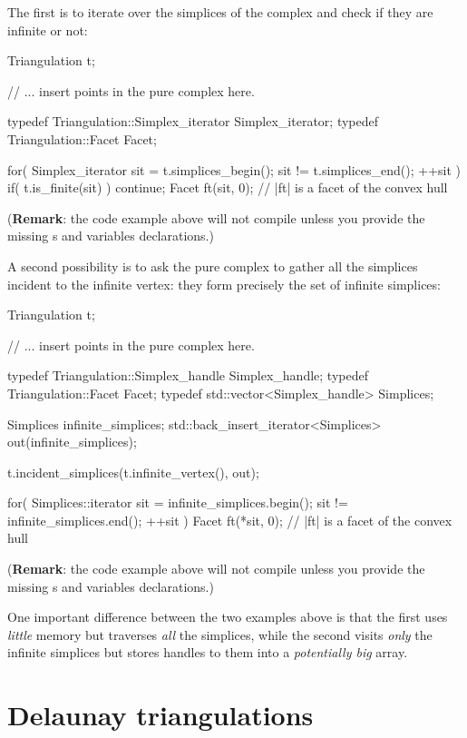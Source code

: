 {{The first is to iterate over the simplices of the complex and check if they
are infinite or not:

\begin{ccExampleCode}
Triangulation t;

// ... insert points in the pure complex here.

typedef Triangulation::Simplex_iterator Simplex_iterator;
typedef Triangulation::Facet Facet;

for( Simplex_iterator sit = t.simplices_begin(); sit != t.simplices_end(); ++sit )
{
    if( t.is_finite(sit) )
        continue;
    Facet ft(sit, 0); // |ft| is a facet of the convex hull
}
\end{ccExampleCode}
(\textbf{Remark}: the code example above will not compile unless you provide
the missing s and variables declarations.)

A second possibility is to ask the pure complex to gather all the simplices
incident to the infinite vertex: they form precisely the set of infinite
simplices:

\begin{ccExampleCode}
Triangulation t;

// ... insert points in the pure complex here.

typedef Triangulation::Simplex_handle Simplex_handle;
typedef Triangulation::Facet Facet;
typedef std::vector<Simplex_handle> Simplices;

Simplices infinite_simplices;
std::back_insert_iterator<Simplices> out(infinite_simplices);

t.incident_simplices(t.infinite_vertex(), out);

for( Simplices::iterator sit = infinite_simplices.begin(); sit != infinite_simplices.end(); ++sit )
{
    Facet ft(*sit, 0); // |ft| is a facet of the convex hull
}
\end{ccExampleCode}
(\textbf{Remark}: the code example above will not compile unless you provide
the missing s and variables declarations.)

One important difference between the two examples above is that the first uses
\emph{little} memory but traverses \emph{all} the simplices, while the second
visits \emph{only} the infinite simplices but stores handles to them into a
\emph{potentially big} array.


\section{Delaunay triangulations}%

}}
